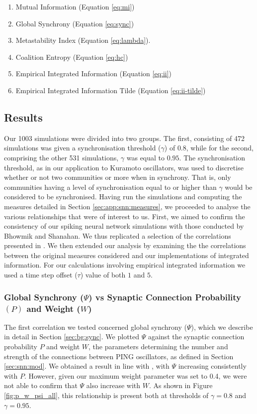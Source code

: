 \documentclass[a4paper,11pt]{article}
\begin{document}
\begin{enumerate}
\item{Mutual Information (Equation \ref{eq:mi})}
\item{Global Synchrony (Equation \ref{eq:sync})}
\item{Metastability Index (Equation \ref{eq:lambda})}.
\item{Coalition Entropy (Equation \ref{eq:hc})}
\item{Empirical Integrated Information (Equation \ref{eq:ii})}
\item{Empirical Integrated Information Tilde (Equation \ref{eq:ii-tilde})}
\end{enumerate}

\subsection{Results}
\label{sec:snn:res}

Our 1003 simulations were divided into two groups. The first, consisting of 472 simulations was given a synchronisation threshold ($\gamma$) of $0.8$, while for the second, comprising the other 531 simulations, $\gamma$ was equal to $0.95$. The synchronisation threshold, as in our application to Kuramoto oscillators, was used to discretise whether or not two communities or more when in synchrony. That is, only communities having a level of synchronisation equal to or higher than $\gamma$ would be considered to be synchronised. Having run the simulations and computing the measures detailed in Section \ref{sec:app:snn:measures}, we proceeded to analyse the various relationships that were of interest to us. First, we aimed to confirm the consistency of our spiking neural network simulations with those conducted by Bhowmik and Shanahan. We thus replicated a selection of the correlations presented in \cite{Bhowmik2013}. We then extended our analysis by examining the the correlations between the original measures considered and our implementations of integrated information. For our calculations involving empirical integrated information we used a time step offset ($\tau$) value of both $1$ and $5$.

\subsubsection{Global Synchrony ($\Psi$) vs Synaptic Connection Probability $(P)$ and Weight ($W$)}
\label{sec:app:snn:res:sync}
The first correlation we tested concerned global synchrony ($\Psi$), which we describe in detail in Section \ref{sec:bg:sync}. We plotted $\Psi$ against the synaptic connection probability $P$ and weight $W$, the parameters determining the number and strength of the connections between PING oscillators, as defined in Section \ref{sec:snn:mod}. We obtained a result in line with \cite{Bhowmik2013}, with $\Psi$ increasing consistently with $P$. However, given our maximum weight parameter was set to 0.4, we were not able to confirm that $\Psi$ also increase with $W$. As shown in Figure \ref{fig:p_w_psi_all}, this relationship is present both at thresholds of $\gamma = 0.8$ and $\gamma = 0.95$.
\end{document}
